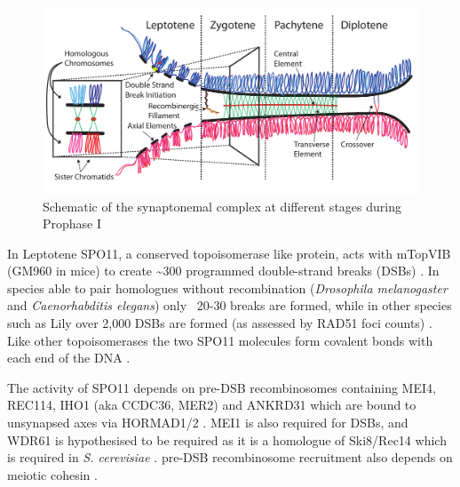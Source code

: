 \begin{figure}[H]
	\centering
	\includegraphics[width=\textwidth]{figures/intro/synaptonemal_complex.pdf}
	\caption[Synaptonemal Complex]{Schematic of the synaptonemal complex at different stages during Prophase I~\parencite[based on ][]{Gaysinskaya2018MOESM1, Gaysinskaya2018Transient, Cohen2010Predicting, Bolcun-Filas2012Chapter, Hughes2018Female, Cahoon2017Superresolution}}
	\label{fig:synaptonemal_complex}
\end{figure}

In Leptotene SPO11, a conserved topoisomerase like protein, acts with mTopVIB (GM960 in mice) to create \textasciitilde300 programmed double-strand breaks (DSBs) \parencite{Sun1989Doublestrand, Keeney1997MeiosisSpecific, Bergerat1997atypical, Cole2012Homeostatic, Vrielynck2016DNA, Robert2016TopoVIBLike, Li2019highresolution}. In species able to pair homologues without recombination (\textit{Drosophila melanogaster} and \textit{Caenorhabditis elegans}) only ~20-30 breaks are formed, while in other species such as Lily over 2,000 DSBs are formed (as assessed by RAD51 foci counts) \parencite{Terasawa1995Localization}. Like other topoisomerases the two SPO11 molecules form covalent bonds with each end of the DNA \parencite{Neale2005Endonucleolytic}.

The activity of SPO11 depends on pre-DSB recombinosomes containing MEI4, REC114, IHO1 (aka CCDC36, MER2) and ANKRD31 which are bound to unsynapsed axes via HORMAD1/2 \parencite{Kumar2010Functional,Panizza2011Spo11Accessory, Stanzione2016Meiotic, Kumar2018Mouse, Papanikos2019Mouse, Boekhout2019REC114}. MEI1 is also required for DSBs, and WDR61 is hypothesised to be required as it is a homologue of Ski8/Rec14 which is required in \textit{S. cerevisiae} \parencite[reviewed in][]{Kumar2010Initiation, Lam2015Mechanism}. pre-DSB recombinosome recruitment also depends on meiotic cohesin \parencite{Bhattacharyya2019Prdm9}.

